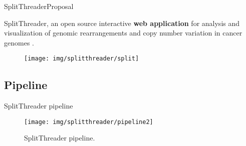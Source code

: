 \documentclass[10pt]{beamer}
\newcommand{\1}{
	\setbeamertemplate{background}{
		\texttt{[image: img/1]}
		\tikz[overlay] \fill[fill opacity=0.75,fill=white] (0,0) rectangle (-\paperwidth,\paperheight);
	}
}
\begin{document}
\begin{frame}{SplitThreader}{Proposal}	
	\begin{block}{}
		SplitThreader, an open source interactive \textbf{web application} for analysis and visualization of genomic rearrangements and copy number	variation in cancer genomes \cite{nattestad2016splitthreader}.
	\end{block}	

	\begin{figure}
		\centering
		\texttt{[image: img/splitthreader/split]}
	\end{figure}	
\end{frame}


\subsection{Pipeline}


\begin{frame}{SplitThreader pipeline}{}	
	\begin{figure}[h]
		\centering
		\texttt{[image: img/splitthreader/pipeline2]}
		\caption{SplitThreader pipeline.}
		\label{fig:pipeline}
	\end{figure}	
\end{frame}
\end{document}
